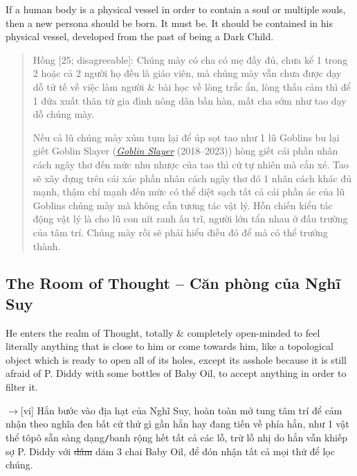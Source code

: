 \documentclass[12pt,twoside]{book}
\begin{document}
If a human body is a physical vessel in order to contain a soul or multiple souls, then a new persona should be born. It must be. It should be contained in his physical vessel, developed from the past of being a Dark Child.
\begin{quote}
	{\sf Hồng [25; disagreeable]}: Chúng mày có cha có mẹ đầy đủ, chưa kể 1 trong 2 hoặc cả 2 người họ đều là giáo viên, mà chúng mày vẫn chưa được dạy dỗ tử tế về việc làm người \& bài học về lòng trắc ẩn, lòng thấu cảm thì để 1 đứa xuất thân từ gia đình nông dân bần hàn, mất cha sớm như tao dạy dỗ chúng mày.
	
	Nếu cả lũ chúng mày xúm tụm lại để úp sọt tao như 1 lũ Goblins bu lại giết Goblin Slayer (\href{https://www.imdb.com/title/tt8690728/}{\it Goblin Slayer} (2018--2023)) hòng giết cái phần nhân cách ngây thơ đến mức nhu nhược của tao thì cứ tự nhiên mà cắn xé. Tao sẽ xây dựng trên cái xác phần nhân cách ngây thơ đó 1 nhân cách khác đủ mạnh, thậm chí mạnh đến mức có thể diệt sạch tất cả cái phần ác của lũ Goblins chúng mày mà không cần tương tác vật lý. Hỗn chiến kiểu tác động vật lý là cho lũ con nít ranh ấu trĩ, người lớn tẩn nhau ở đấu trường của tâm trí. Chúng mày rồi sẽ phải hiểu điều đó để mà có thể trưởng thành.
\end{quote}

\subsection{The Room of Thought -- Căn phòng của Nghĩ Suy}
He enters the realm of Thought, totally \& completely open-minded to feel literally anything that is close to him or come towards him, like a topological object which is ready to open all of its holes, except its asshole because it is still afraid of {\sc P. Diddy} with some bottles of Baby Oil, to accept anything in order to filter it.

{\sf[en]$\to$[vi]} Hắn bước vào địa hạt của Nghĩ Suy, hoàn toàn mở tung tâm trí để cảm nhận theo nghĩa đen bất cứ thứ gì gần hắn hay đang tiến về phía hắn, như 1 vật thể tôpô sẵn sàng dạng{\tt/}banh rộng hết tất cả các lỗ, trừ lỗ nhị do hắn vẫn khiếp sợ {\sc P. Diddy} với \st{dâm} dăm 3 chai Baby Oil, để đón nhận tất cả mọi thứ để lọc chúng.
\end{document}

